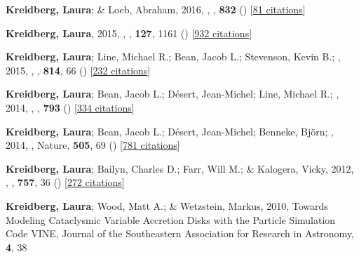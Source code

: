 \item[{\color{numcolor}\scriptsize7}] \textbf{Kreidberg, Laura}; \& Loeb, Abraham, 2016, , \apj, \textbf{832} () [\href{https://ui.adsabs.harvard.edu/abs/2016ApJ...832L..12K}{81 citations}]

\item[{\color{numcolor}\scriptsize6}] \textbf{Kreidberg, Laura}, 2015, , \pasp, \textbf{127}, 1161 () [\href{https://ui.adsabs.harvard.edu/abs/2015PASP..127.1161K}{932 citations}]

\item[{\color{numcolor}\scriptsize5}] \textbf{Kreidberg, Laura}; Line, Michael R.; Bean, Jacob L.; Stevenson, Kevin B.; \etal, 2015, , \apj, \textbf{814}, 66 () [\href{https://ui.adsabs.harvard.edu/abs/2015ApJ...814...66K}{232 citations}]

\item[{\color{numcolor}\scriptsize4}] \textbf{Kreidberg, Laura}; Bean, Jacob L.; D{\'e}sert, Jean-Michel; Line, Michael R.; \etal, 2014, , \apj, \textbf{793} () [\href{https://ui.adsabs.harvard.edu/abs/2014ApJ...793L..27K}{334 citations}]

\item[{\color{numcolor}\scriptsize3}] \textbf{Kreidberg, Laura}; Bean, Jacob L.; D{\'e}sert, Jean-Michel; Benneke, Bj{\"o}rn; \etal, 2014, , Nature, \textbf{505}, 69 () [\href{https://ui.adsabs.harvard.edu/abs/2014Natur.505...69K}{781 citations}]

\item[{\color{numcolor}\scriptsize2}] \textbf{Kreidberg, Laura}; Bailyn, Charles D.; Farr, Will M.; \& Kalogera, Vicky, 2012, , \apj, \textbf{757}, 36 () [\href{https://ui.adsabs.harvard.edu/abs/2012ApJ...757...36K}{272 citations}]

\item[{\color{numcolor}\scriptsize1}] \textbf{Kreidberg, Laura}; Wood, Matt A.; \& Wetzstein, Markus, 2010, Towards Modeling Cataclysmic Variable Accretion Disks with the Particle Simulation Code VINE, Journal of the Southeastern Association for Research in Astronomy, \textbf{4}, 38